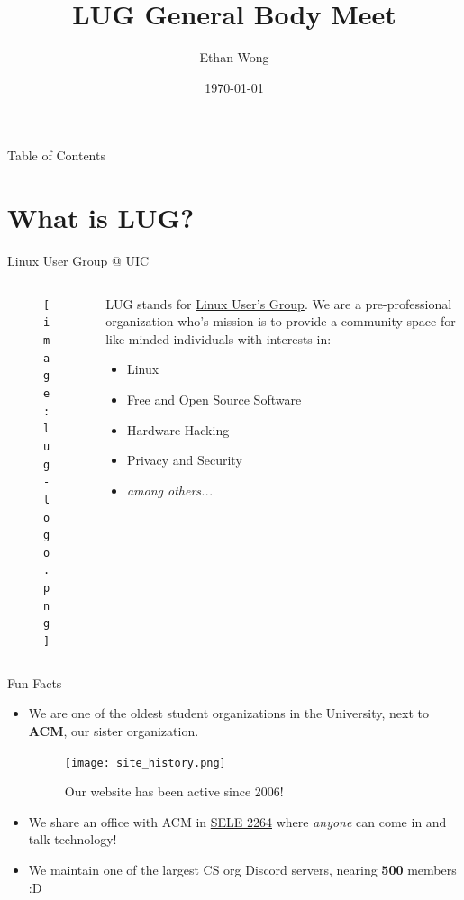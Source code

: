 \documentclass{beamer}
\title{LUG General Body Meet}
\author{Ethan Wong}
\date{\today}
\institute{Linux Users Group @ UIC}
\begin{document}
\begin{frame}
	\titlepage
\end{frame}

\begin{frame}{Table of Contents}
	\tableofcontents[pausesections]
\end{frame}

\section{What is LUG?}
\begin{frame}{Linux User Group @ UIC}
	\begin{columns}
		\begin{column}{0.5\textwidth}
			\begin{figure}
				\centering
				\texttt{[image: lug-logo.png]}
			\end{figure}
		\end{column}
		\begin{column}{0.5\textwidth}
			LUG stands for \underline{Linux User's Group}.
			\pause We are a pre-professional organization who's mission is to
			provide a community space for like-minded individuals with interests
			in:
			\begin{itemize}
				\item Linux
				\item Free and Open Source Software
				\item Hardware Hacking
				\item Privacy and Security
				\item \textit{among others...}
			\end{itemize}
		\end{column}
	\end{columns}
\end{frame}

\begin{frame}{Fun Facts}
	\begin{itemize}
		\item We are one of the oldest student organizations in the University,
		      next to \textbf{ACM}, our sister organization.
		      \pause
		      \begin{figure}
			      \centering
			      \texttt{[image: site\_history.png]}
			      \caption{Our website has been active since 2006!}
		      \end{figure}
		      \pause
		\item We share an office with ACM in \underline{SELE 2264}
		      where \textit{anyone} can come in and talk technology!
		      \pause
		\item We maintain one of the largest CS org Discord servers,
		      nearing \textbf{500} members :D
	\end{itemize}
\end{frame}
\end{document}
